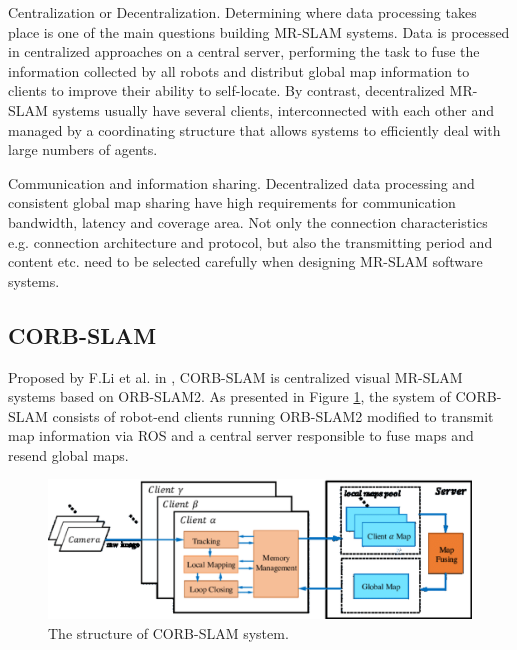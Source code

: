 \begin{inparaenum}[1.]
	\item Centralization or Decentralization. Determining where data processing takes place is one of the main questions building MR-SLAM systems. Data is processed in centralized approaches on a central server, performing the task to fuse  the information collected by all robots and distribut global map information to clients to improve their ability to self-locate\cite{forster2013collaborative, li2012laser,li2017corb}. By contrast, decentralized MR-SLAM systems usually have several clients, interconnected with each other and managed by a coordinating structure that allows systems to efficiently deal with large numbers of agents\cite{bresson2013consistent,fox2006distributed}. 
	
	\item Communication and information sharing. Decentralized data processing and consistent global map sharing have high requirements for communication bandwidth, latency and coverage area. Not only the connection characteristics e.g. connection architecture and protocol, but also the transmitting period and content etc. need to be selected carefully when designing MR-SLAM software systems.
\end{inparaenum}

\subsection{CORB-SLAM}
Proposed by F.Li et al. in \cite{li2017corb}, CORB-SLAM is centralized visual MR-SLAM systems based on ORB-SLAM2. As presented in Figure \ref{fig:corbslamoverview}, the system of CORB-SLAM consists of robot-end clients running ORB-SLAM2 modified to transmit map information via ROS and a central server responsible to fuse maps and resend global maps.
\begin{figure}[H]
	\centering
	\includegraphics[width=5in]{Chapter2/CORBSLAMOverview.eps}
	\caption{The structure of CORB-SLAM system.}
	\label{fig:corbslamoverview} 
\end{figure}

